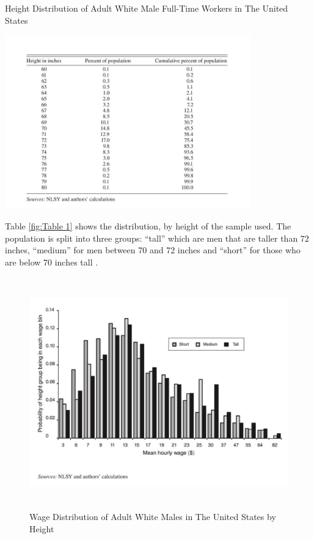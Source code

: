 \documentclass[titlepage]{\econtex}
\begin{document}
\begin{table}[H]
  \centering
    \caption{Height Distribution of Adult White Male Full-Time Workers in The United States}
    \includegraphics[width=0.8\textwidth]{HeightDistribution.JPG}
    \label{fig:Table 1}
  \end{table}
  
  Table \ref{fig:Table 1} shows the distribution, by height of the sample used. The population is split into three groups: ``tall'' which are men that are taller than 72 inches, ``medium'' for men  between 70 and 72 inches and ``short'' for those who are below 70 inches tall .
  
\begin{figure}[H]
  \centering
  \includegraphics[width=1\textwidth, height=10cm]{WageDistributionGraph.JPG}
  \caption{Wage Distribution of Adult White Males in The United States by Height}
    \label{fig:Figure 1}
  \end{figure}
\end{document}

